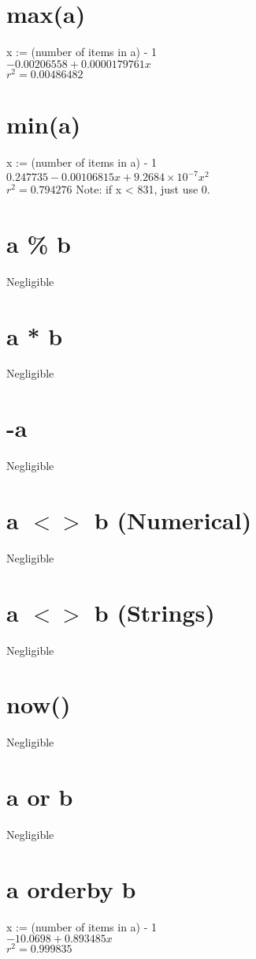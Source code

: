 \documentclass[12pt]{article}
\begin{document}
	\section{max(a)}
	x := (number of items in a) - 1\\
	$-0.00206558 + 0.0000179761 x$\\
	$r^2 = 0.00486482$
	
	\section{min(a)}
	x := (number of items in a) - 1\\
	$0.247735 - 0.00106815 x + 9.2684 \times 10^{-7} x^2$\\
	$r^2 = 0.794276$
	Note: if x < 831, just use 0.
	
	\section{a \% b}
	Negligible
	
	\section{a * b}
	Negligible
	
	\section{-a}
	Negligible
	
	\section{a $<>$ b (Numerical)}
	Negligible
	
	\section{a $<>$ b (Strings)}
	Negligible
	
	\section{now()}
	Negligible
	
	\section{a or b}
	Negligible
	
	\section{a orderby b} %
	x := (number of items in a) - 1\\
	$-10.0698 + 0.893485 x$\\
	$r^2 = 0.999835$
	
\end{document}
